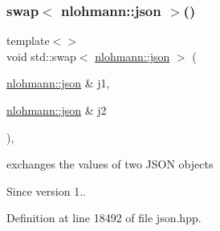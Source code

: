 \subsubsection{\texorpdfstring{swap$<$ nlohmann\+::json $>$()}{swap< nlohmann::json >()}}
{\footnotesize\ttfamily template$<$$>$ \\
void std\+::swap$<$ \hyperlink{namespacenlohmann_a2bfd99e845a2e5cd90aeaf1b1431f474}{nlohmann\+::json} $>$ (\begin{DoxyParamCaption}\item[{\hyperlink{namespacenlohmann_a2bfd99e845a2e5cd90aeaf1b1431f474}{nlohmann\+::json} \&}]{j1,  }\item[{\hyperlink{namespacenlohmann_a2bfd99e845a2e5cd90aeaf1b1431f474}{nlohmann\+::json} \&}]{j2 }\end{DoxyParamCaption})\hspace{0.3cm}{\ttfamily [inline]}, {\ttfamily [noexcept]}}



exchanges the values of two J\+S\+ON objects 

\begin{DoxySince}{Since}
version 1.. 
\end{DoxySince}


Definition at line 18492 of file json.\+hpp.

